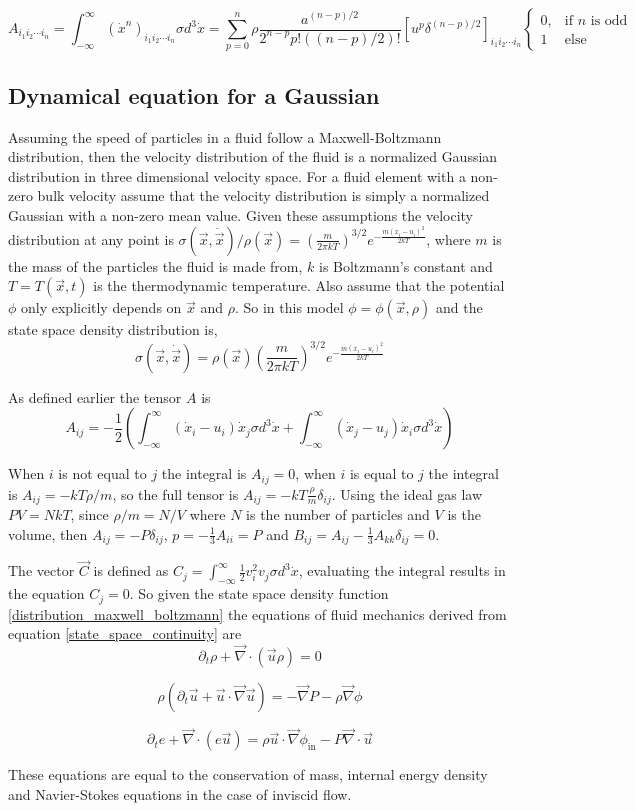 \documentclass[%
preprint,
 amsmath,amssymb,
 aps,
]{revtex4-1}
\newcommand{\dvec}[1]{\dot{\vec{#1}}}
\newcommand{\grad}{\vec{\nabla}}
\newcommand{\intVdot}[1]{\int_{-\infty}^{\infty} #1 d^3\dot{x}}
\begin{document}
\[
A_{i_1i_2\cdots i_n}=\intVdot{\left(\dot{x}^n\right)_{i_1i_2\cdots i_n}\sigma}=\sum_{p=0}^n\rho\frac{a^{\left(n-p\right)/2}}{2^{n-p}p!\left(\left(n-p\right)/2\right)!}\left[u^p\delta^{\left(n-p\right)/2}\right]_{i_1i_2\cdots i_n}
\begin{cases}
0, & \text{if $n$ is odd}\\
1 &  \text{else}
\end{cases}
\]

\subsection{Dynamical equation for a Gaussian}
Assuming the speed of particles in a fluid follow a Maxwell-Boltzmann distribution, then the velocity distribution of the fluid is a normalized Gaussian distribution in three dimensional velocity space. For a fluid element with a non-zero bulk velocity assume that the velocity distribution is simply a normalized Gaussian with a non-zero mean value. Given these assumptions the velocity distribution at any point is $\sigma(\vec{x}, \dvec{x}) / \rho(\vec{x}) = \left(\frac{m}{2\pi kT}\right)^{3/2}e^{-\frac{m\left(x_i - u_i\right)^2}{2kT}}$, where $m$ is the mass of the particles the fluid is made from, $k$ is Boltzmann's constant and $T=T(\vec{x}, t)$ is the thermodynamic temperature. Also assume that the potential $\phi$ only explicitly depends on $\vec{x}$ and $\rho$. So in this model $\phi=\phi(\vec{x}, \rho)$ and the state space density distribution is,
\begin{equation}
\sigma(\vec{x}, \dvec{x}) = \rho(\vec{x})\left(\frac{m}{2\pi kT}\right)^{3/2}e^{-\frac{m\left(x_i - u_i\right)^2}{2kT}}
\label{distribution_maxwell_boltzmann}
\end{equation}

As defined earlier the tensor $A$ is
\[
A_{ij} = -\frac{1}{2}\left(\intVdot{\left(\dot{x}_i - u_i\right)\dot{x}_j\sigma} + \intVdot{\left(\dot{x}_j - u_j\right)\dot{x}_i\sigma}\right)
\]

When $i$ is not equal to $j$ the integral is $A_{ij} = 0$, when $i$ is equal to $j$ the integral is $A_{ij} = -kT\rho/m$, so the full tensor is $A_{ij}=-kT\frac{\rho}{m}\delta_{ij}$. Using the ideal gas law $PV=NkT$, since $\rho/m=N/V$ where $N$ is the number of particles and $V$ is the volume, then $A_{ij} = -P\delta_{ij}$, $p=-\frac{1}{3}A_{ii}=P$ and $B_{ij}=A_{ij}-\frac{1}{3}A_{kk}\delta_{ij} = 0$.

The vector $\vec{C}$ is defined as $C_j = \intVdot{\frac{1}{2}v_i^2 v_j\sigma}$, evaluating the integral results in the equation $C_j = 0$. So given the state space density function \eqref{distribution_maxwell_boltzmann} the equations of fluid mechanics derived from equation \eqref{state_space_continuity} are
\[
\partial_t\rho + \grad\cdot\left(\vec{u}\rho\right)=0
\]

\[
\rho\left(\partial_t \vec{u} + \vec{u}\cdot\grad\vec{u}\right) = - \grad P - \rho\grad\phi
\]

\[
\partial_te + \grad\cdot\left(e \vec{u}\right) = \rho\vec{u}\cdot\grad\phi_{\text{in}} - P\grad\cdot\vec{u}
\]

These equations are equal to the conservation of mass, internal energy density and Navier-Stokes equations in the case of inviscid flow.
\end{document}

